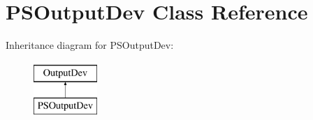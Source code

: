 \hypertarget{class_p_s_output_dev}{}\section{P\+S\+Output\+Dev Class Reference}
\label{class_p_s_output_dev}
Inheritance diagram for P\+S\+Output\+Dev\+:\begin{figure}[H]
\begin{center}
\leavevmode
\includegraphics[height=2.000000cm]{class_p_s_output_dev}
\end{center}
\end{figure}
